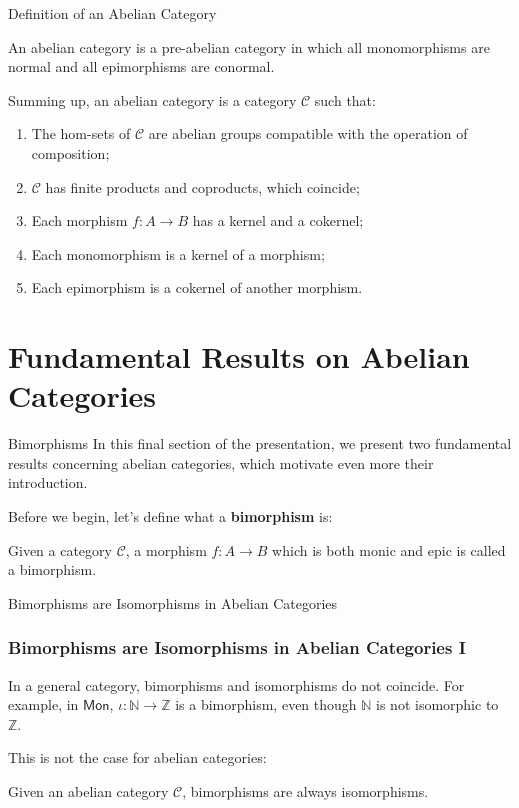 \documentclass{beamer}
\newcommand{\NN}{\mathbb{N}}
\newcommand{\ZZ}{\mathbb{Z}}
\newcommand{\cat}[1]{\mathsf{#1}}
\begin{document}
\begin{frame}{Definition of an Abelian Category}
    \begin{definition}
        An abelian category is a pre-abelian category in which all monomorphisms are normal
        and all epimorphisms are conormal.
    \end{definition}

    Summing up, an abelian category is a category $\mathcal{C}$ such that:
    \begin{enumerate}
        \item The hom-sets of $\mathcal{C}$ are abelian groups compatible with the
            operation of composition;
        \item $\mathcal{C}$ has finite products and coproducts, which coincide;
        \item Each morphism $f : A \to B$ has a kernel and a cokernel;
        \item Each monomorphism is a kernel of a morphism;
        \item Each epimorphism is a cokernel of another morphism.
    \end{enumerate}
\end{frame}


\section{Fundamental Results on Abelian Categories}

\begin{frame}{Bimorphisms}
    In this final section of the presentation, we present
    two fundamental results concerning abelian categories, which
    motivate even more their introduction. \medskip
    
    Before we begin, let's
    define what a \textbf{bimorphism} is:

    \begin{definition}[Bimorphism]
        Given a category $\mathcal{C}$, a morphism
        $f : A \to B$ which is both monic and epic is
        called a bimorphism. 
    \end{definition}
\end{frame}

\begin{frame}{Bimorphisms are Isomorphisms in Abelian Categories}
    \frametitle{Bimorphisms are Isomorphisms in Abelian Categories I}

    In a general category, bimorphisms and isomorphisms do not
    coincide. For example, in $\cat{Mon}$, $\iota : \NN \to \ZZ$
    is a bimorphism, even though $\NN$ is not isomorphic to $\ZZ$. \medskip

    This is not the case for abelian categories:
    \begin{theorem}
        Given an abelian category $\mathcal{C}$, bimorphisms are
        always isomorphisms.
    \end{theorem}
\end{frame}
\end{document}
